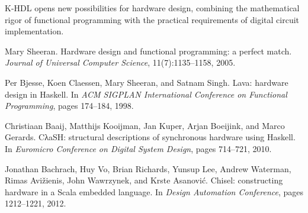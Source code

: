 \documentclass[10pt,twocolumn]{article}
\begin{document}
K-HDL opens new possibilities for hardware design, combining the mathematical rigor of functional programming with the practical requirements of digital circuit implementation.


\begin{thebibliography}{9}

Mary Sheeran.
\newblock Hardware design and functional programming: a perfect match.
\newblock \emph{Journal of Universal Computer Science}, 11(7):1135--1158, 2005.

Per Bjesse, Koen Claessen, Mary Sheeran, and Satnam Singh.
\newblock Lava: hardware design in Haskell.
\newblock In \emph{ACM SIGPLAN International Conference on Functional Programming}, pages 174--184, 1998.

Christiaan Baaij, Matthijs Kooijman, Jan Kuper, Arjan Boeijink, and Marco Gerards.
\newblock CλaSH: structural descriptions of synchronous hardware using Haskell.
\newblock In \emph{Euromicro Conference on Digital System Design}, pages 714--721, 2010.

Jonathan Bachrach, Huy Vo, Brian Richards, Yunsup Lee, Andrew Waterman, Rimas Avižienis, John Wawrzynek, and Krste Asanović.
\newblock Chisel: constructing hardware in a Scala embedded language.
\newblock In \emph{Design Automation Conference}, pages 1212--1221, 2012.

\end{thebibliography}
\end{document}
